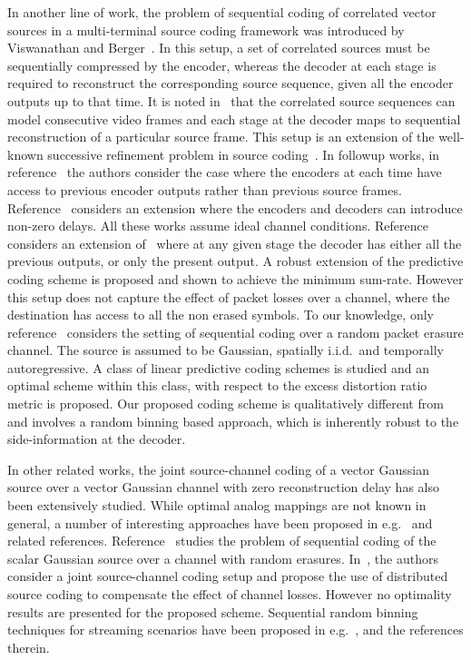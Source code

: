 \documentclass[journal, twocolumn, 10pt]{IEEEtran}
\begin{document}
In another line of work, the problem of sequential coding of  correlated vector sources in a multi-terminal source coding framework was introduced by Viswanathan and Berger~\cite{berger}.  In this setup, a set of correlated sources must be sequentially compressed by the encoder, whereas the decoder at each stage is required to reconstruct the corresponding source sequence, given all the encoder outputs up to that time. It is noted in~\cite{berger} that the correlated source sequences can model consecutive video frames and each stage at the decoder maps to sequential reconstruction of a particular source frame. This setup is an extension of the  well-known  successive refinement problem in source coding~\cite{equitzCover:91}. In followup works, in reference~\cite{Wu} the authors consider the case where the encoders at each time have access to previous encoder outputs rather than previous source frames.
Reference~\cite{ishwar} considers an extension where the encoders and decoders can introduce non-zero delays. All these works assume ideal channel conditions.
Reference~\cite{songChen12} considers an extension of~\cite{berger}  where at any given stage the decoder has either all the previous outputs, or only the present output. A robust extension of the predictive coding scheme is proposed and shown to achieve the minimum sum-rate. However this setup does not capture the effect of packet losses over a channel, where the destination has access to all the non erased symbols.  To our knowledge, only reference~\cite{Huang:08} considers the setting of  sequential coding over a random packet erasure channel. The source is assumed to be Gaussian, spatially i.i.d.\, and temporally autoregressive. A class of  linear predictive coding schemes is studied and an optimal scheme within this class, with respect to the excess distortion ratio metric is proposed. Our proposed coding scheme is qualitatively different from~\cite{Huang:08, songChen12} and involves a random binning based approach,  which is inherently robust to the side-information at the decoder.

In other related works, the joint source-channel coding of a vector Gaussian source over a vector Gaussian channel with zero reconstruction delay has also been extensively studied. While optimal analog mappings are not known in general, a number of interesting approaches have been proposed in e.g.~\cite{Chung:00,tuncel} and related references.  Reference~\cite{arildsen} studies the problem of sequential coding of the scalar Gaussian source over a channel with random erasures. In~\cite{Wang:06}, the authors  consider a joint source-channel coding setup and propose the use of distributed source coding  to compensate the effect of channel losses. However no optimality results are presented for the proposed scheme. Sequential random binning techniques for streaming scenarios have been proposed in e.g.~\cite{Chang:07}, \cite{draper} and the references therein.
\end{document}
